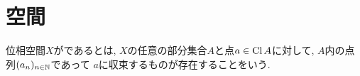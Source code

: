 \documentclass[uplatex, dvipdfmx, a4paper, 12pt, class=jsbook, crop=false]{standalone}
\begin{document}
\section{\Frechet 空間}
\label{sec:Frechet-spaces}

\begin{definition}
	位相空間$ X $が\indexe{\Frechet}であるとは,
	$ X $の任意の部分集合$ A $と点$ a \in \mathop{\mathrm{Cl}}\nolimits A $に対して,
	$ A $内の点列$ (a_n)_{n \in \mathbb{N}} $であって
	$ a $に収束するものが存在することをいう.
\end{definition}
\end{document}
